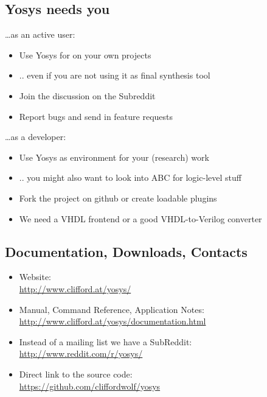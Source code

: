 
\subsection{Yosys needs you}

\begin{frame}{\subsecname}
\dots as an active user:
\begin{itemize}
\item Use Yosys for on your own projects
\item .. even if you are not using it as final synthesis tool
\item Join the discussion on the Subreddit
\item Report bugs and send in feature requests
\end{itemize}

\bigskip
\dots as a developer:
\begin{itemize}
\item Use Yosys as environment for your (research) work
\item .. you might also want to look into ABC for logic-level stuff
\item Fork the project on github or create loadable plugins
\item We need a VHDL frontend or a good VHDL-to-Verilog converter
\end{itemize}
\end{frame}


\subsection{Documentation, Downloads, Contacts}

\begin{frame}{\subsecname}
\begin{itemize}
\item Website: \\
\smallskip\hskip1cm\url{http://www.clifford.at/yosys/}

\bigskip
\item Manual, Command Reference, Application Notes: \\
\smallskip\hskip1cm\url{http://www.clifford.at/yosys/documentation.html}

\bigskip
\item Instead of a mailing list we have a SubReddit: \\
\smallskip\hskip1cm\url{http://www.reddit.com/r/yosys/}

\bigskip
\item Direct link to the source code: \\
\smallskip\hskip1cm\url{https://github.com/cliffordwolf/yosys}
\end{itemize}
\end{frame}

